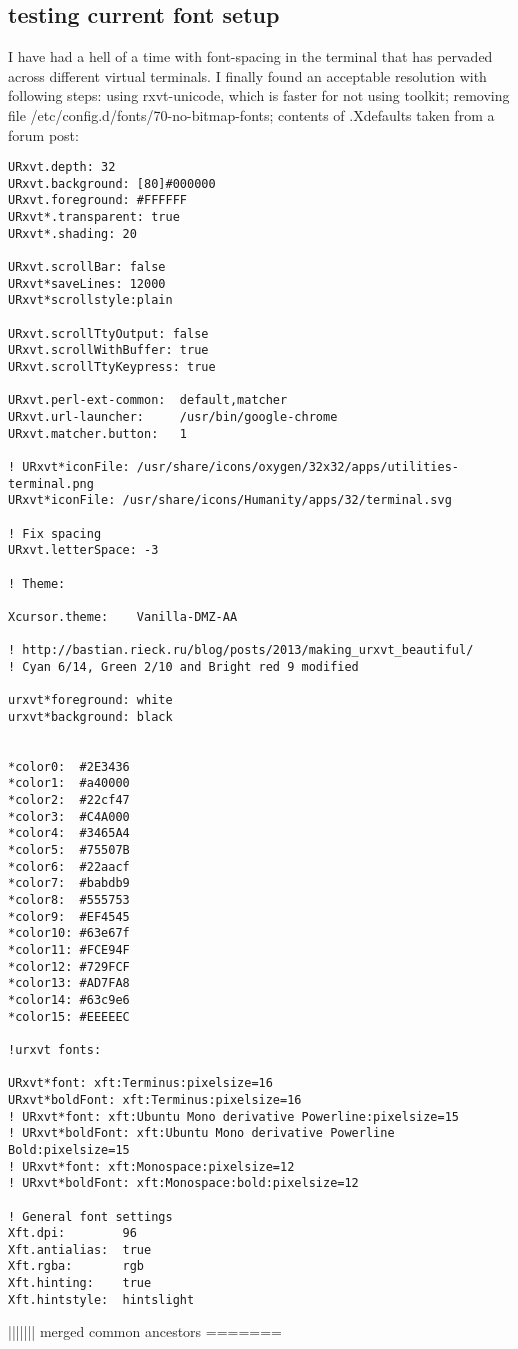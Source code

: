 \subsection*{ testing current font setup }
I have had a hell of a time with font-spacing in the terminal that has pervaded across different virtual terminals. I finally found an acceptable resolution with following steps:
using rxvt-unicode, which is faster for not using toolkit;
removing file /etc/config.d/fonts/70-no-bitmap-fonts;
contents of .Xdefaults taken from a forum post:

\begin{lstlisting}
URxvt.depth: 32
URxvt.background: [80]#000000
URxvt.foreground: #FFFFFF
URxvt*.transparent: true
URxvt*.shading: 20

URxvt.scrollBar: false
URxvt*saveLines: 12000
URxvt*scrollstyle:plain

URxvt.scrollTtyOutput: false
URxvt.scrollWithBuffer: true
URxvt.scrollTtyKeypress: true

URxvt.perl-ext-common:  default,matcher
URxvt.url-launcher:     /usr/bin/google-chrome
URxvt.matcher.button:   1

! URxvt*iconFile: /usr/share/icons/oxygen/32x32/apps/utilities-terminal.png
URxvt*iconFile: /usr/share/icons/Humanity/apps/32/terminal.svg

! Fix spacing
URxvt.letterSpace: -3

! Theme:

Xcursor.theme:    Vanilla-DMZ-AA

! http://bastian.rieck.ru/blog/posts/2013/making_urxvt_beautiful/
! Cyan 6/14, Green 2/10 and Bright red 9 modified

urxvt*foreground: white
urxvt*background: black


*color0:  #2E3436
*color1:  #a40000
*color2:  #22cf47
*color3:  #C4A000
*color4:  #3465A4
*color5:  #75507B
*color6:  #22aacf
*color7:  #babdb9
*color8:  #555753
*color9:  #EF4545
*color10: #63e67f
*color11: #FCE94F
*color12: #729FCF
*color13: #AD7FA8
*color14: #63c9e6
*color15: #EEEEEC

!urxvt fonts: 

URxvt*font: xft:Terminus:pixelsize=16
URxvt*boldFont: xft:Terminus:pixelsize=16
! URxvt*font: xft:Ubuntu Mono derivative Powerline:pixelsize=15
! URxvt*boldFont: xft:Ubuntu Mono derivative Powerline Bold:pixelsize=15
! URxvt*font: xft:Monospace:pixelsize=12
! URxvt*boldFont: xft:Monospace:bold:pixelsize=12

! General font settings
Xft.dpi:        96
Xft.antialias:  true
Xft.rgba:       rgb
Xft.hinting:    true
Xft.hintstyle:  hintslight
\end{lstlisting}
||||||| merged common ancestors
=======

